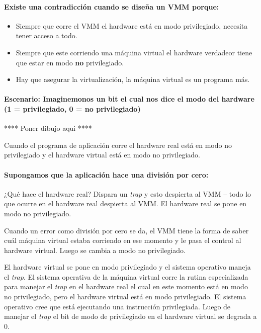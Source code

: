 \documentclass[12pt, times]{simauth}
\begin{document}
\paragraph{Existe una contradicción cuando se diseña un VMM porque:}
\begin{itemize}
    \item Siempre que corre el VMM el hardware está en modo privilegiado, necesita tener acceso a todo.
    \item Siempre que este corriendo una máquina virtual el hardware verdadeor tiene que estar en modo \textbf{no} privilegiado.
    \item Hay que asegurar la virtualización, la máquina virtual es un programa más.
\end{itemize}

\paragraph{Escenario: Imaginemonos un bit el cual nos dice el modo del hardware (1 = privilegiado, 0 = no privilegiado)}

\large{**** Poner dibujo aqui ****}

Cuando el programa de aplicación corre el hardware real está en modo no privilegiado y el hardware virtual está en modo no privilegiado.

\paragraph{Supongamos que la aplicación hace una división por cero:} 
¿Qué hace el hardware real? Dispara un \emph{trap} y esto despierta al VMM -- todo lo que ocurre en el hardware real despierta al VMM. El hardware real se pone en modo no privilegiado.

Cuando un error como división por cero se da, el VMM tiene la forma de saber cuál máquina virtual estaba corriendo en ese momento y le pasa el control al hardware virtual. Luego se cambia a modo no privilegiado.

El hardware virtual se pone en modo privilegiado y el sistema operativo maneja el \emph{trap}. El sistema operativa de la máquina virtual corre la rutina especializada para manejar el \emph{trap} en el hardware real el cual en este momento está en modo no privilegiado, pero el hardware virtual está en modo privilegiado. El sistema operativo cree que está ejecutando una instrucción privilegiada. Luego de manejar el \emph{trap} el bit de modo de privilegiado en el hardware virtual se degrada a 0. 
\end{document}
